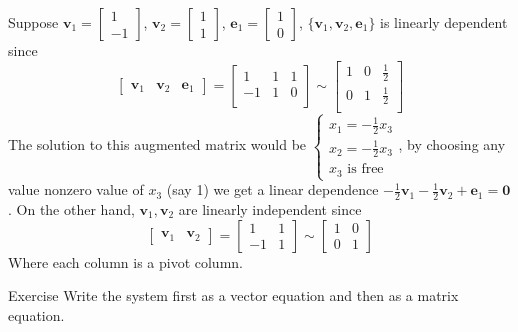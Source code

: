 \documentclass{beamer}
\theoremstyle{definition}
\theoremstyle{remark}
\begin{document}
\begin{frame}[t]
\begin{example}\label{06:35-06/06/2022}
Suppose $\mathbf v_1=\begin{bmatrix}
1\\-1
\end{bmatrix}$, $\mathbf v_2=\begin{bmatrix}
1\\1
\end{bmatrix}$, $\mathbf e_1=\begin{bmatrix}
1\\0
\end{bmatrix}$, $\{\mathbf v_1,\mathbf v_2,\mathbf e_1\}$ is linearly dependent since
\[
\begin{bmatrix}
\mathbf v_1&\mathbf v_2&\mathbf e_1
\end{bmatrix}=\begin{bmatrix}
1&1&1\\
-1&1&0\\
\end{bmatrix}\sim\begin{bmatrix}
1&0&\frac{1}{2}\\
0&1&\frac{1}{2}\\
\end{bmatrix}
\]\pause
The solution to this augmented matrix would be $\begin{cases}
x_1=-\frac{1}{2}x_3\\
x_2=-\frac{1}{2}x_3\\
x_3\text{ is free}
\end{cases}$, by choosing any value nonzero value of $x_3$ (say 1) we get a linear dependence $-\frac{1}{2}\mathbf v_1-\frac{1}{2}\mathbf v_2+\mathbf e_1=\mathbf0$\pause. On the other hand, $\mathbf v_1,\mathbf v_2$ are linearly independent since
\[
\begin{bmatrix}
\mathbf v_1&\mathbf v_2
\end{bmatrix}=\begin{bmatrix}
1&1\\
-1&1
\end{bmatrix}\sim\begin{bmatrix}
1&0\\
0&1
\end{bmatrix}
\]
Where each column is a pivot column.
\end{example}
\end{frame}

\begin{frame}[t]{Exercise}
Write the system  first as a vector equation and then as a matrix equation.
\end{frame}
\end{document}
